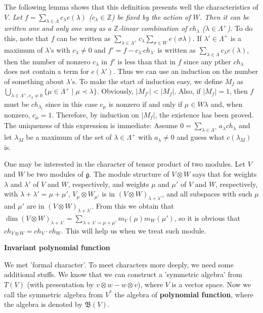 \documentclass{article}
\newcommand{\InZ}{\mathbb{Z}}
\newcommand{\SBar}{\;|\;}
\newcommand{\lie}[1]{\mathfrak{#1}}
\begin{document}
The following lemma shows that this definition presents well the characteristics of $V$.
\textit{Let $f = \sum_{\lambda \in \Lambda} c_\lambda e(\lambda)$ ($c_\lambda \in \InZ$) be fixed by the action of $W$.
Then it can be written one and only one way as a $\InZ$-linear combination of $ch_\lambda$ ($\lambda \in \Lambda^+$).}
To do this, note that $f$ can be written as $\sum_{\lambda \in \Lambda^+} c_\lambda \sum_{\sigma \in W} e(\sigma \lambda)$.
If $\lambda' \in \Lambda^+$ is a maximum of $\lambda$'s with $c_\lambda \ne 0$ and $f' = f - c_{\lambda'} ch_{\lambda'}$ is written as $\sum_{\lambda \in \Lambda} c_\lambda e(\lambda)$, then the number of nonzero $c_\lambda$ in $f'$ is less than that in $f$ since any pther $ch_\lambda$ does not contain a term for $e(\lambda')$.
Thus we can use an induction on the number of something about $\lambda$'s.
To make the start of induction easy, we define $M_f$ as $\bigcup_{\lambda \in \Lambda^+, c_\lambda \ne 0} \{\mu \in \Lambda^+ \SBar \mu \prec \lambda\}$.
Obviously, $|M_{f'}| < |M_f|$.
Also, if $|M_f| = 1$, then $f$ must be $ch_{\lambda_i}$ since in this case $c_\mu$ is nonzero if and only if $\mu \in W\lambda$ and, when nonzero, $c_\mu = 1$.
Therefore, by induction on $|M_f|$, the existence has been proved.
The uniqueness of this expression is immediate: Assume $0 = \sum_{\lambda \in \Lambda^+} a_\lambda ch_\lambda$ and let $\lambda_M$ be a maximum of the set of $\lambda \in \Lambda^+$ with $a_\lambda \ne 0$ and guess what $c(\lambda_M)$ is.

One may be interested in the character of tensor product of two modules.
Let $V$ and $W$ be two modules of $\lie{g}$.
The module structure of $V \otimes W$  says that for weights $\lambda$ and $\lambda'$ of $V$ and $W$, respectively, and weights $\mu$ and $\mu'$ of $V$ and $W$, respectively, with $\lambda + \lambda' = \mu + \mu'$, $V_\mu \otimes W_{\mu'}$ is in $(V \otimes W)_{\lambda + \lambda'}$, and all subspaces with such $\mu$ and $\mu'$ are in $(V \otimes W)_{\lambda + \lambda'}$.
From this we obtain that $\dim{(V \otimes W)_{\lambda + \lambda'}} = \sum_{\lambda + \lambda' = \mu + \mu'} m_V(\mu) m_W(\mu')$, so it is obvious that \textit{$ch_{V \otimes W} = ch_V \cdot ch_W$}.
This will help us when we treat such module.


\newpage

\textbf{Invariant polynomial function}

We met 'formal character'.
To meet characters more deeply, we need some additional stuffs.
We know that we can construct a 'symmetric algebra' from $T(V)$ (with presentation by $v \otimes w - w \otimes v$), where $V$ is a vector space.
Now we call the symmetric algebra from $V^*$ the algebra of \textbf{polynomial function}, where the algebra is denoted by $\mathfrak{B}(V)$.
\end{document}
